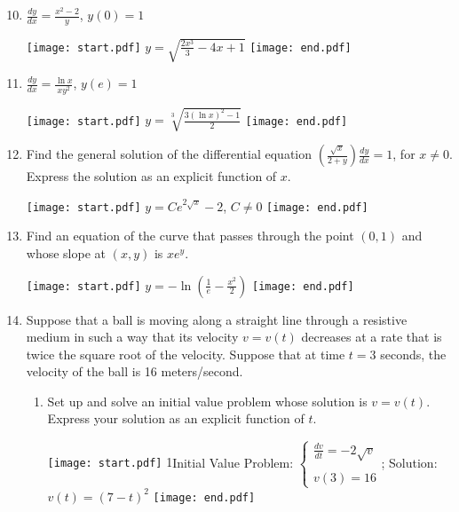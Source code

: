 \documentclass[12pt]{article}
\begin{document}
\begin{enumerate}
\setcounter{enumi}{9}

\item $\frac{dy}{dx}=\frac{x^2-2}{y}$, $y(0)=1$

\texttt{[image: start.pdf]}
{{$y=\sqrt{\frac{2x^3}{3}-4x+1}$}}
\texttt{[image: end.pdf]}


\item $\frac{dy}{dx}=\frac{\ln{x}}{xy^2}$, $y(e)=1$

\texttt{[image: start.pdf]}
{{$y=\sqrt[3]{\frac{3(\ln{x})^2-1}{2}}$}}
\texttt{[image: end.pdf]}


\item Find the general solution of the differential equation $\left(\frac{\sqrt{x}}{2+y}\right)\frac{dy}{dx}=1$, for $x \neq 0$.  Express the solution as an explicit function of $x$.

\texttt{[image: start.pdf]}
{{$y=Ce^{2\sqrt{x}}-2$, $C \neq 0$}}
\texttt{[image: end.pdf]}


\item Find an equation of the curve that passes through the point $(0,1)$ and whose slope at $(x,y)$ is $xe^y$.

\texttt{[image: start.pdf]}
{{$y=-\ln{\left(\frac{1}{e}-\frac{x^2}{2}\right)}$}}
\texttt{[image: end.pdf]}



\item Suppose that a ball is moving along a straight line through a resistive medium in such a way that its velocity $v=v(t)$ decreases at a rate that is twice the square root of the velocity.  Suppose that at time $t=3$ seconds, the velocity of the ball is 16 meters/second.

\begin{enumerate}

\item Set up and solve an initial value problem whose solution is $v=v(t)$.  Express your solution as an explicit function of $t$.

\texttt{[image: start.pdf]}
{{{1\linewidth}{Initial Value Problem:
$\left\{\begin{array}{l}
\frac{dv}{dt}=-2\sqrt{v}\\
\\
v(3)=16
\end{array}\right.$; Solution:
$v(t)=(7-t)^2$}}}
\texttt{[image: end.pdf]}



\end{enumerate}
\end{enumerate}
\end{document}
